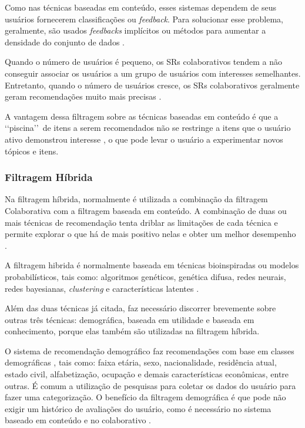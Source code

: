 Como nas técnicas baseadas em conteúdo, esses sistemas dependem de seus usuários fornecerem classificações ou \emph{feedback}. Para solucionar 
esse problema, geralmente, são usados \emph{feedbacks} implícitos ou métodos para aumentar 
a densidade do conjunto de dados \cite{paulson2003}.

Quando o número de usuários é pequeno, os SRs colaborativos tendem a não conseguir associar 
os usuários a um grupo de usuários com interesses semelhantes. Entretanto, quando o 
número de usuários cresce, os SRs colaborativos geralmente geram recomendações muito mais 
precisas \cite{mauricio}. 

A vantagem dessa filtragem sobre as técnicas baseadas em conteúdo é que a \lq\lq piscina\rq\rq\  de itens a serem recomendados 
não se restringe a itens que o usuário ativo demonstrou interesse \cite{paulson2003}, o que pode levar o usuário a experimentar novos tópicos e itens.


\subsubsection{Filtragem Híbrida}

Na filtragem híbrida, normalmente é utilizada a combinação da filtragem Colaborativa com a filtragem 
baseada em conteúdo\cite{bobadilla2013}. A combinação de duas ou mais técnicas de recomendação tenta driblar as limitações de cada 
técnica e permite explorar o que há de mais positivo nelas e obter um melhor desempenho \cite{burke2002}. 

A filtragem hibrida é normalmente baseada em técnicas bioinspiradas ou modelos probabilísticos, tais como: 
algoritmos genéticos, genética difusa, redes neurais, redes bayesianas, \emph{clustering} e características latentes  \cite{bobadilla2013}.

Além das duas técnicas já citada, faz necessário discorrer brevemente sobre outras três técnicas: demográfica, baseada em utilidade e baseada em conhecimento, porque 
elas também são utilizadas na filtragem híbrida.


O sistema de recomendação demográfico faz recomendações com base em classes demográficas \cite{burke2002}, tais 
como: faixa etária, sexo, nacionalidade, residência atual, estado civil, 
alfabetização, ocupação e demais características econômicas, entre outras. É comum a utilização de pesquisas para 
coletar os  dados do usuário para fazer uma categorização. O benefício da filtragem demográfica é que
pode não exigir um histórico de avaliações do usuário, como é necessário no sistema baseado em conteúdo e no colaborativo \cite{burke2002}.


